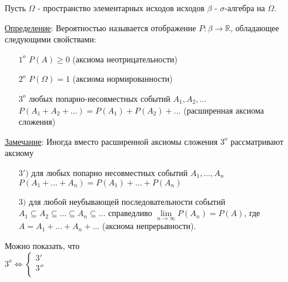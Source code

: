 Пусть $\Omega$ - пространство элементарных исходов исходов $\beta$ - $\sigma$-алгебра на $\Omega$.

\underline{Определение}: Вероятностью называется отображение $P: \beta \rightarrow \mathbb{R}$, обладающее следующими свойствами:
\begin{enumerate}
	\item[$1^o$]
	$P(A) \geqslant 0$ (аксиома неотрицательности)
	
	\item[$2^o$]
	$P(\Omega) = 1$ (аксиома нормированности)
	
	\item[$3^o$]
	любых попарно-несовместных событий $A_1, A_2, \ldots$ \\
	$P(A_1 + A_2 + \ldots) = P(A_1) + P(A_2) + \ldots$ (расширенная аксиома сложения)
\end{enumerate}

\underline{Замечание}: Иногда вместо расширенной аксиомы сложения $3^o$ рассматривают аксиому 
\begin{enumerate}
	\item[$3')$] 
	для любых попарно несовместных событий $A_1, \ldots , A_n$ \\
	$P(A_1 + \ldots + A_n) = P(A_1) + \ldots + P(A_n)$
	
	\item[$3)$]
	для любой неубывающей последовательности событий $A_1 \subseteq A_2 \subseteq \ldots \subseteq A_n \subseteq \ldots$ справедливо $\lim\limits_{n \rightarrow \infty} P(A_n) = P(A)$, где $A = A_1 + \ldots + A_n + \ldots$ (аксиома непрерывности).
\end{enumerate}

Можно показать, что \\
$3^o \Leftrightarrow
\begin{cases}
	3' \\
	3'' \\
\end{cases}$






































